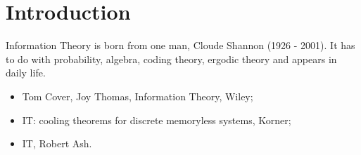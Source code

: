 \chapter{Introduction}
Information Theory is born from one man, Cloude Shannon (1926 - 2001). It has to do with probability, algebra, coding theory, ergodic theory and appears in daily life. 

\begin{itemize}
	\item Tom Cover, Joy Thomas, Information Theory, Wiley;
	\item IT: cooling theorems for discrete memoryless systems, Korner;
	\item IT, Robert Ash.
\end{itemize}





